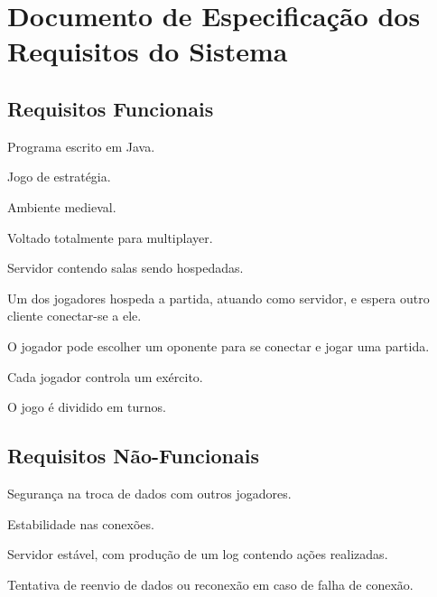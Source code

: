 \section{Documento de Especificação dos Requisitos do Sistema}

\subsection{Requisitos Funcionais}

\begin{itemise}
    \item Programa escrito em Java.
    \item Jogo de estratégia.
    \item Ambiente medieval.
    \item Voltado totalmente para multiplayer.
    \item Servidor contendo salas sendo hospedadas.
    \item Um dos jogadores hospeda a partida, atuando como servidor, e espera outro cliente conectar-se a ele.
    \item O jogador pode escolher um oponente para se conectar e jogar uma partida.
    \item Cada jogador controla um exército.
    \item O jogo é dividido em turnos.
\end{itemise}

\subsection{Requisitos Não-Funcionais}

\begin{itemise}
    \item Segurança na troca de dados com outros jogadores.
    \item Estabilidade nas conexões.
    \item Servidor estável, com produção de um log contendo ações realizadas.
    \item Tentativa de reenvio de dados ou reconexão em caso de falha de conexão.
\end{itemise}
